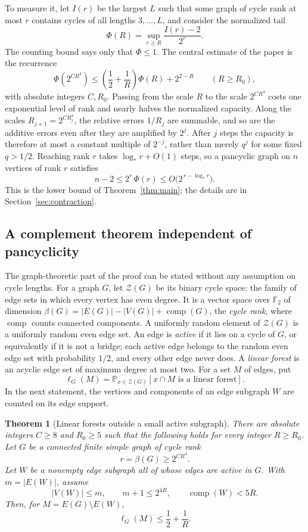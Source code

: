\documentclass[11pt,a4paper]{article}
\numberwithin{equation}{section}
\newtheorem{theorem}{Theorem}[section]
\theoremstyle{definition}
\theoremstyle{remark}
\newcommand{\F}{\mathbb F_2}
\newcommand{\cZ}{\mathcal Z}
\newcommand{\Prob}{\mathbb P}
\newcommand{\cc}{\operatorname{comp}}
\newcommand{\lstar}{\log_*}
\begin{document}
To measure it, let $I(r)$ be the largest $L$ such that some graph of cycle rank at most $r$ contains cycles of all lengths $3,\ldots,L$, and consider the normalized tail
\[
 \Phi(R)=\sup_{r\ge R}\frac{I(r)-2}{2^r}.
\]
The counting bound says only that $\Phi\le1$. The central estimate of the paper is the recurrence
\begin{equation}\label{eq:intro-recurrence}
 \Phi(2^{CR^4})\le\left(\frac12+\frac1R\right)\Phi(R)+2^{2-R}
 \qquad(R\ge R_0),
\end{equation}
with absolute integers $C,R_0$. Passing from the scale $R$ to the scale $2^{CR^4}$ costs one exponential level of rank and nearly halves the normalized capacity. Along the scales $R_{j+1}=2^{CR_j^4}$, the relative errors $1/R_j$ are summable, and so are the additive errors even after they are amplified by $2^j$. After $j$ steps the capacity is therefore at most a constant multiple of $2^{-j}$, rather than merely $q^j$ for some fixed $q>1/2$. Reaching rank $r$ takes $\lstar r+O(1)$ steps, so a pancyclic graph on $n$ vertices of rank $r$ satisfies
\[
 n-2\le2^r\,\Phi(r)\le O\bigl(2^{\,r-\lstar r}\bigr).
\]
This is the lower bound of Theorem~\ref{thm:main}; the details are in Section~\ref{sec:contraction}.

\subsection{A complement theorem independent of pancyclicity}\label{sec:complement-intro}
The graph-theoretic part of the proof can be stated without any assumption on cycle lengths. For a graph $G$, let $\cZ(G)$ be its binary cycle space: the family of edge sets in which every vertex has even degree. It is a vector space over $\F$ of dimension $\beta(G)=|E(G)|-|V(G)|+\cc(G)$, the \emph{cycle rank}, where $\cc$ counts connected components. A uniformly random element of $\cZ(G)$ is a uniformly random even edge set. An edge is \emph{active} if it lies on a cycle of $G$, or equivalently if it is not a bridge; each active edge belongs to the random even edge set with probability $1/2$, and every other edge never does. A \emph{linear forest} is an acyclic edge set of maximum degree at most two. For a set $M$ of edges, put
\[
 \ell_G(M)=\Prob_{x\in\cZ(G)}[x\cap M\text{ is a linear forest}].
\]
In the next statement, the vertices and components of an edge subgraph $W$ are counted on its edge support.

\begin{theorem}[Linear forests outside a small active subgraph]\label{thm:complement}
There are absolute integers $C\ge8$ and $R_0\ge5$ such that the following holds for every integer $R\ge R_0$. Let $G$ be a connected finite simple graph of cycle rank
\[
 r=\beta(G)\ge 2^{CR^4}.
\]
Let $W$ be a nonempty edge subgraph all of whose edges are active in $G$. With $m=|E(W)|$, assume
\[
 |V(W)|\le m,\qquad m+1\le 2^{4R},\qquad \cc(W)<5R.
\]
Then, for $M=E(G)\setminus E(W)$,
\begin{equation}\label{eq:intro-complement}
 \ell_G(M)\le\frac12+\frac1R.
\end{equation}
\end{theorem}
\end{document}
